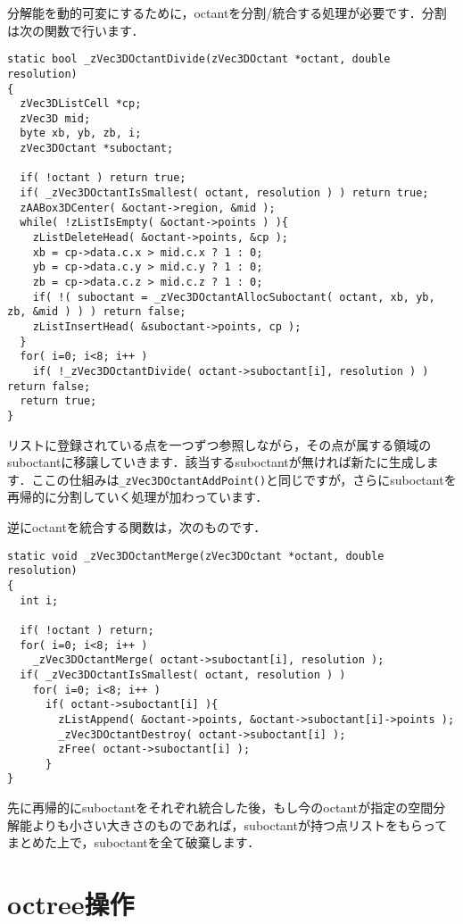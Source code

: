﻿\documentclass[a4paper]{jsarticle}
\begin{document}
分解能を動的可変にするために，octantを分割/統合する処理が必要です．分割は次の関数で行います．
\begin{screen}
\begin{verbatim}
static bool _zVec3DOctantDivide(zVec3DOctant *octant, double resolution)
{
  zVec3DListCell *cp;
  zVec3D mid;
  byte xb, yb, zb, i;
  zVec3DOctant *suboctant;

  if( !octant ) return true;
  if( _zVec3DOctantIsSmallest( octant, resolution ) ) return true;
  zAABox3DCenter( &octant->region, &mid );
  while( !zListIsEmpty( &octant->points ) ){
    zListDeleteHead( &octant->points, &cp );
    xb = cp->data.c.x > mid.c.x ? 1 : 0;
    yb = cp->data.c.y > mid.c.y ? 1 : 0;
    zb = cp->data.c.z > mid.c.z ? 1 : 0;
    if( !( suboctant = _zVec3DOctantAllocSuboctant( octant, xb, yb, zb, &mid ) ) ) return false;
    zListInsertHead( &suboctant->points, cp );
  }
  for( i=0; i<8; i++ )
    if( !_zVec3DOctantDivide( octant->suboctant[i], resolution ) ) return false;
  return true;
}
\end{verbatim}
\end{screen}

リストに登録されている点を一つずつ参照しながら，その点が属する領域のsuboctantに移譲していきます．該当するsuboctantが無ければ新たに生成します．ここの仕組みは\verb|_zVec3DOctantAddPoint()|と同じですが，さらにsuboctantを再帰的に分割していく処理が加わっています．

逆にoctantを統合する関数は，次のものです．
\begin{screen}
\begin{verbatim}
static void _zVec3DOctantMerge(zVec3DOctant *octant, double resolution)
{
  int i;

  if( !octant ) return;
  for( i=0; i<8; i++ )
    _zVec3DOctantMerge( octant->suboctant[i], resolution );
  if( _zVec3DOctantIsSmallest( octant, resolution ) )
    for( i=0; i<8; i++ )
      if( octant->suboctant[i] ){
        zListAppend( &octant->points, &octant->suboctant[i]->points );
        _zVec3DOctantDestroy( octant->suboctant[i] );
        zFree( octant->suboctant[i] );
      }
}
\end{verbatim}
\end{screen}

先に再帰的にsuboctantをそれぞれ統合した後，もし今のoctantが指定の空間分解能よりも小さい大きさのものであれば，suboctantが持つ点リストをもらってまとめた上で，suboctantを全て破棄します．



\section{octree操作}
\end{document}
